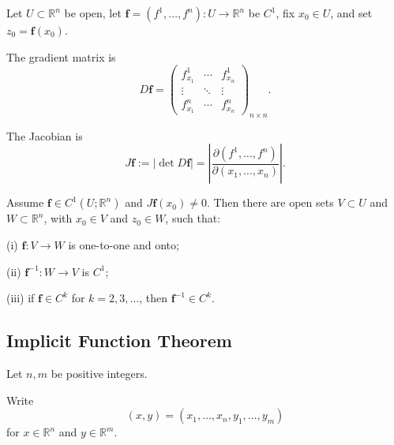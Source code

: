 Let $U\subset\mathbb R^n$ be open, let $\mathbf f=(f^1,\ldots,f^n):U\to\mathbb R^n$ be $C^1$, fix $x_0\in U$, and set $z_0=\mathbf f(x_0)$.

\begin{definition}
\label{def:gradient-matrix-df-square-notation}
The gradient matrix is
\[
D\mathbf f=
\begin{pmatrix}
f^1_{x_1}&\cdots&f^1_{x_n}\\
\vdots&\ddots&\vdots\\
f^n_{x_1}&\cdots&f^n_{x_n}
\end{pmatrix}_{n\times n}.
\]
\end{definition}

\begin{definition}
\label{def:jacobian-jf}
The Jacobian is
\[
J\mathbf f
:=|\det D\mathbf f|
=\left|\frac{\partial(f^1,\ldots,f^n)}
{\partial(x_1,\ldots,x_n)}\right|.
\]
\end{definition}

\begin{theorem}
\label{thm:inverse-function-theorem}
Assume $\mathbf f\in C^1(U;\mathbb R^n)$ and $J\mathbf f(x_0)\ne0$. Then there are open sets $V\subset U$ and $W\subset\mathbb R^n$, with $x_0\in V$ and $z_0\in W$, such that:

(i) $\mathbf f:V\to W$ is one-to-one and onto;

(ii) $\mathbf f^{-1}:W\to V$ is $C^1$;

(iii) if $\mathbf f\in C^k$ for $k=2,3,\ldots$, then $\mathbf f^{-1}\in C^k$.
\end{theorem}

\subsection{Implicit Function Theorem}

Let $n,m$ be positive integers.

\begin{definition}
\label{def:xy-point-notation-rnm}
Write
\[
(x,y)=(x_1,\ldots,x_n,y_1,\ldots,y_m)
\]
for $x\in\mathbb R^n$ and $y\in\mathbb R^m$.
\end{definition}

